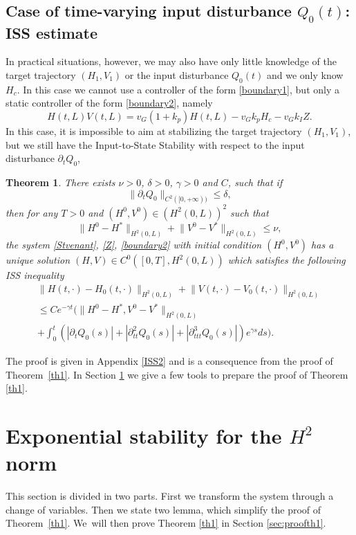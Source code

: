 \documentclass[JEP,XML,SOM,Unicode]{cedram}
\newtheorem{thm}{Theorem}[section]
\theoremstyle{definition}
\begin{document}
\subsection{Case of time-varying input disturbance $Q_{0}(t)$: ISS estimate}
In practical situations, however, we may also have only
little knowledge of the target trajectory $(H_{1},V_{1})$ or the input disturbance $Q_{0}(t)$ and we only know $H_{c}$. In this case we cannot use a controller of the form \eqref{boundary1},
but only a static controller of the form \eqref{boundary2}, namely\vspace*{-3pt}
\begin{equation*}
H(t,L)V(t,L)=v_{G}(1+k_{p})H(t,L)-v_{G}k_{p}H_{c}-v_{G}k_{I}Z.
\end{equation*}
In this case, it is impossible to aim at stabilizing the target trajectory $(H_{1},V_{1})$, but we still have the Input-to-State Stability with respect to the input disturbance $\partial_{t}Q_{0}$,
\begin{thm}
\label{th2}
There exists $\nu>0$, $\delta>0$, $\gamma>0$ and $C$, such that if\vspace*{-3pt}
\[
\lVert\partial_{t}Q_{0}\rVert_{C^{2}([0,+\infty))}\leq\delta,
\]
then for any $T>0$ and $(H^{0},V^{0})\in {(H^{2}(0,L))^{2}}$ such that\vspace*{-3pt}
\begin{equation*}
\lVert H^{0}-H^{*}\rVert_{H^{2}(0,L)}+\lVert V^{0}-V^{*}\rVert_{H^{2}(0,L)}\leq \nu,
\end{equation*}
the system \eqref{Stvenant}, \eqref{Z}, \eqref{boundary2} with initial condition $(H^{0},V^{0})$ has a unique solution $(H,V)\in C^{0}([0,T],H^{2}(0,L))$ which satisfies the following ISS inequality
\begin{multline}
\label{ISSHV}
\lVert H(t,\cdot)-H_{0}(t,\cdot)\rVert_{H^{2}(0,L)}+\lVert V(t,\cdot)-V_{0}(t,\cdot)\rVert_{H^{2}(0,L)}\\
\leq Ce^{-\gamma t}\biggl(\lVert H^{0}-H^{*},V^{0}-V^{*}\rVert_{H^{2}(0,L)}\\[-3pt]
+\int_{0}^{t}(|\partial_{t}Q_{0}(s)|+|\partial_{tt}^{2}Q_{0}(s)|+|\partial_{ttt}^{3}Q_{0}(s)|)e^{\gamma s}ds\biggr).
\end{multline}
\end{thm}
The proof is given in Appendix \ref{ISS2} and is a consequence from the proof of Theorem~\ref{th1}.
In Section \ref{s2} we {give a few tools to prepare the proof of} Theorem \ref{th1}.
\section{Exponential stability for the \texorpdfstring{$H^{2}$}{H2} norm}
\label{s2}
This section is divided in {two} parts. First we transform the system through a change of variables.
Then we state two lemma, which simplify the proof of Theorem~\ref{th1}.
{We~will then prove Theorem \ref{th1} in Section \ref{sec:proofth1}.}
\end{document}
